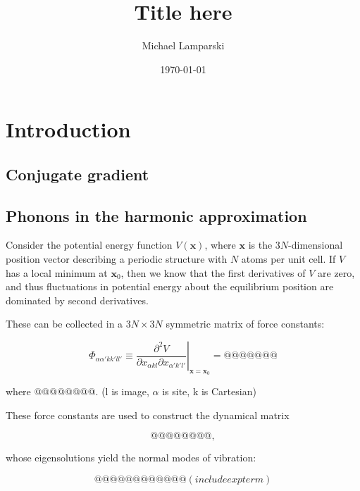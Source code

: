 \documentclass[11pt]{article}
\title{\textbf{Title here}}
\author{Michael Lamparski}
\date{\today}
\theoremstyle{definition}
\theoremstyle{remark}
\renewcommand{\vec}[1]{\mathbf{#1}}
\begin{document}
\setlength\parindent{0em}
\setlength\parskip{1.5em}

\newenvironment{Itemize}
{\begin{itemize}[topsep=0em]}
{\end{itemize}}
\newenvironment{Enumerate}
{\begin{enumerate}[topsep=0em]}
{\end{enumerate}}

\section{Introduction}

\subsection{Conjugate gradient}


\subsection{Phonons in the harmonic approximation}

Consider the potential energy function $V(\vec x)$,
where $\vec x$ is the $3N$-dimensional position vector describing
a periodic structure with $N$ atoms per unit cell.
If $V$ has a local minimum at $\vec x_0$, then we know that the first derivatives of $V$ are zero, and thus fluctuations in potential energy about the equilibrium position
are dominated by second derivatives.

These can be collected in a $3N\times3N$ symmetric matrix of force constants:

\begin{equation}
\Phi_{\alpha\alpha'kk'll'} \equiv \left. \frac{\partial^2 V}{\partial x_{\alpha kl} \partial x_{\alpha' k'l'}} \right|_{\vec x = \vec x_0} = @@@@@@@
\end{equation}

where @@@@@@@@. (l is image, $\alpha$ is site, k is Cartesian)

These force constants are used to construct the dynamical matrix

\begin{equation}
@@@@@@@@,
\end{equation}

whose eigensolutions yield the normal modes of vibration:

\begin{equation}
@@@@@@@@@@@@ (include exp term)
\end{equation}
\end{document}
